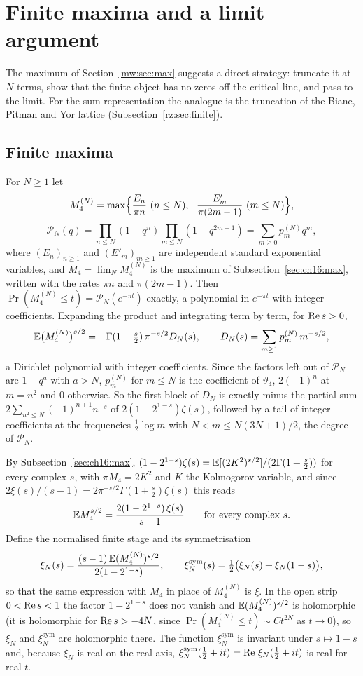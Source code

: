 
\section{Finite maxima and a limit argument}\label{mw:sec:finite}

The maximum of Section~\ref{mw:sec:max} suggests a direct strategy: truncate it at $N$ terms, show that the finite object has no zeros off the critical line, and pass to the limit. For the sum representation the analogue is the truncation of the Biane, Pitman and Yor lattice (Subsection~\ref{rz:sec:finite}).

\subsection{Finite maxima}

For $N\geq1$ let
\[
M_4^{(N)}=\max\Bigl\{\frac{E_n}{\pi n}\ (n\leq N),\ \ \frac{E'_m}{\pi(2m-1)}\ (m\leq N)\Bigr\},
\]
\[
\mathcal P_N(q)=\prod_{n\leq N}(1-q^n)\prod_{m\leq N}(1-q^{2m-1})=\sum_{m\geq0}p^{(N)}_mq^m,
\]
where $(E_n)_{n\geq1}$ and $(E'_m)_{m\geq1}$ are independent standard exponential variables, and $M_4=\lim_NM_4^{(N)}$ is the maximum of Subsection~\ref{sec:ch16:max}, written with the rates $\pi n$ and $\pi(2m-1)$. Then $\Pr(M_4^{(N)}\leq t)=\mathcal P_N(e^{-\pi t})$ exactly, a polynomial in $e^{-\pi t}$ with integer coefficients. Expanding the product and integrating term by term, for $\operatorname{Re} s>0$,
\[
\mathbb{E}\bigl(M_4^{(N)}\bigr)^{s/2}=-\Gamma(1+\tfrac s2)\,\pi^{-s/2}D_N(s),\qquad D_N(s)=\sum_{m\geq1}p^{(N)}_m\,m^{-s/2},
\]
a Dirichlet polynomial with integer coefficients. Since the factors left out of $\mathcal P_N$ are $1-q^a$ with $a>N$, $p^{(N)}_m$ for $m\leq N$ is the coefficient of $\vartheta_4$, $2(-1)^n$ at $m=n^2$ and $0$ otherwise. So the first block of $D_N$ is exactly minus the partial sum $2\sum_{n^2\leq N}(-1)^{n+1}n^{-s}$ of $2(1-2^{1-s})\zeta(s)$, followed by a tail of integer coefficients at the frequencies $\frac12\log m$ with $N<m\leq N(3N+1)/2$, the degree of $\mathcal P_N$.

By Subsection~\ref{sec:ch16:max}, $(1-2^{1-s})\zeta(s)=\mathbb{E}[(2K^2)^{s/2}]/(2\Gamma(1+\frac s2))$ for every complex $s$, with $\pi M_4=2K^2$ and $K$ the Kolmogorov variable, and since $2\xi(s)/(s-1)=2\pi^{-s/2}\Gamma(1+\frac s2)\zeta(s)$ this reads
\[
\mathbb{E} M_4^{s/2}=\frac{2(1-2^{1-s})\,\xi(s)}{s-1}\qquad\text{for every complex }s.
\]
Define the normalised finite stage and its symmetrisation
\[
\xi_N(s)=\frac{(s-1)\,\mathbb{E}(M_4^{(N)})^{s/2}}{2(1-2^{1-s})},\qquad \xi_N^{\mathrm{sym}}(s)=\tfrac12\bigl(\xi_N(s)+\xi_N(1-s)\bigr),
\]
so that the same expression with $M_4$ in place of $M_4^{(N)}$ is $\xi$. In the open strip $0<\operatorname{Re} s<1$ the factor $1-2^{1-s}$ does not vanish and $\mathbb{E}(M_4^{(N)})^{s/2}$ is holomorphic (it is holomorphic for $\operatorname{Re} s>-4N$, since $\Pr(M_4^{(N)}\leq t)\sim Ct^{2N}$ as $t\to0$), so $\xi_N$ and $\xi_N^{\mathrm{sym}}$ are holomorphic there. The function $\xi_N^{\mathrm{sym}}$ is invariant under $s\mapsto1-s$ and, because $\xi_N$ is real on the real axis, $\xi_N^{\mathrm{sym}}(\tfrac12+it)=\operatorname{Re}\,\xi_N(\tfrac12+it)$ is real for real $t$.

